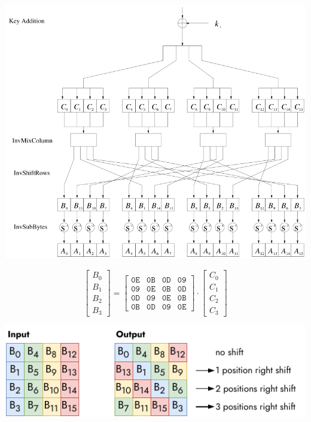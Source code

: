 \documentclass[
  10pt,
  a4paper,
]{article}
\begin{document}
\begin{multicols*}{2}
\includegraphics{images/crypto/image-18.png}

\[
\begin{bmatrix}
B_0\\ B_1\\ B_2 \\ B_3
\end{bmatrix}=\begin{bmatrix}
\mathtt{0E} & \mathtt{0B} & \mathtt{0D} & \mathtt{09}\\
\mathtt{09} & \mathtt{0E} & \mathtt{0B} & \mathtt{0D}\\
\mathtt{0D} & \mathtt{09} & \mathtt{0E} & \mathtt{0B}\\
\mathtt{0B} & \mathtt{0D} & \mathtt{09} & \mathtt{0E}
\end{bmatrix}\cdot\begin{bmatrix}
C_0\\ C_{1}\\ C_{2} \\ C_{3}
\end{bmatrix}
\]

\includegraphics{images/crypto/invshiftrow.pdf}


\end{multicols*}
\end{document}
